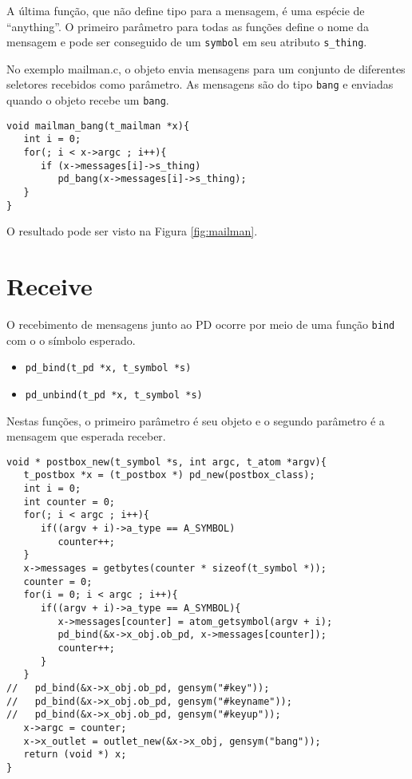A última função, que não define tipo para a mensagem, é uma espécie de ``anything''.
O primeiro parâmetro para todas as funções define o nome da mensagem e pode ser
conseguido de um \texttt{symbol} em seu atributo \texttt{s\_thing}.

No exemplo mailman.c, o objeto envia mensagens para um conjunto de diferentes 
seletores recebidos como parâmetro.
As mensagens são do tipo \texttt{bang} e enviadas quando o objeto recebe um \texttt{bang}.

\begin{lstlisting}[caption=Envio de mensagens bang por send]
void mailman_bang(t_mailman *x){
   int i = 0;
   for(; i < x->argc ; i++){
      if (x->messages[i]->s_thing)
         pd_bang(x->messages[i]->s_thing);
   }
}
\end{lstlisting}

O resultado pode ser visto na Figura \ref{fig:mailman}.


\section{Receive}

O recebimento de mensagens junto ao PD ocorre por meio de uma função
\texttt{bind} com o o símbolo esperado.

\begin{itemize}
   \item \texttt{pd\_bind(t\_pd *x, t\_symbol *s)}
   \item \texttt{pd\_unbind(t\_pd *x, t\_symbol *s)}
\end{itemize}

Nestas funções, o primeiro parâmetro é seu objeto e o segundo parâmetro é a
mensagem que esperada receber.

\begin{lstlisting}[caption=Exemplo de objeto que recebe várias mensagens]
void * postbox_new(t_symbol *s, int argc, t_atom *argv){
   t_postbox *x = (t_postbox *) pd_new(postbox_class);
   int i = 0;
   int counter = 0;
   for(; i < argc ; i++){
      if((argv + i)->a_type == A_SYMBOL)
         counter++;
   }
   x->messages = getbytes(counter * sizeof(t_symbol *));
   counter = 0;
   for(i = 0; i < argc ; i++){
      if((argv + i)->a_type == A_SYMBOL){
         x->messages[counter] = atom_getsymbol(argv + i);
         pd_bind(&x->x_obj.ob_pd, x->messages[counter]);
         counter++;
      }
   }
//   pd_bind(&x->x_obj.ob_pd, gensym("#key"));
//   pd_bind(&x->x_obj.ob_pd, gensym("#keyname"));
//   pd_bind(&x->x_obj.ob_pd, gensym("#keyup"));
   x->argc = counter;
   x->x_outlet = outlet_new(&x->x_obj, gensym("bang"));
   return (void *) x;
}
\end{lstlisting}

